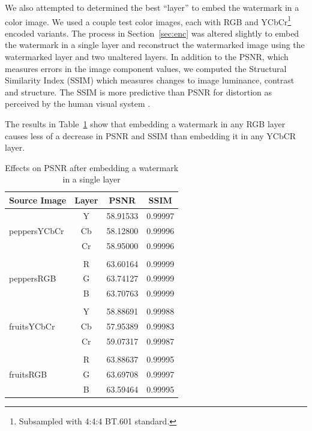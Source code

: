 We also attempted to determined the best ``layer'' to embed the watermark in a color image.
We used a couple test color images, each with RGB and YCbCr\footnote{Subsampled with 4:4:4 BT.601 standard.} encoded variants.
The process in Section~\ref{sec:enc} was altered slightly to embed the watermark in a single layer and reconstruct the watermarked image using the watermarked layer and two unaltered layers.
In addition to the PSNR, which measures errors in the image component values, we computed the Structural Similarity Index (SSIM) which measures changes to image luminance, contrast and structure.
The SSIM is more predictive than PSNR for distortion as perceived by the human visual system \cite{Wang2004}.

The results in Table~\ref{tbl:color-psnr} show that embedding a watermark in any RGB layer causes less of a decrease in PSNR and SSIM than embedding it in any YCbCR layer.

\begin{table}[htpb]
  \centering
  \caption{Effects on PSNR after embedding a watermark in a single layer}
  \label{tbl:color-psnr}
  \begin{tabular}{@{}lcll@{}}
    \toprule
    \multicolumn{1}{c}{Source Image} & Layer & \multicolumn{1}{c}{PSNR}  & \multicolumn{1}{c}{SSIM}   \\
    \midrule
    \multirow{3}{*}{peppersYCbCr}
       & Y   & 58.91533 & 0.99997 \\
       & Cb  & 58.12800 & 0.99996 \\
       & Cr  & 58.95000 & 0.99996 \\
    &  &  \\
    \multirow{3}{*}{peppersRGB}
       & R   & 63.60164 & 0.99999 \\
       & G   & 63.74127 & 0.99999 \\
       & B   & 63.70763 & 0.99999 \\
    &  &  \\
    \multirow{3}{*}{fruitsYCbCr}
      & Y   & 58.88691 & 0.99988 \\
      & Cb  & 57.95389 & 0.99983 \\
      & Cr  & 59.07317 & 0.99987 \\
    &  &  \\
    \multirow{3}{*}{fruitsRGB}
      & R   & 63.88637 & 0.99995 \\
      & G   & 63.69708 & 0.99997 \\
      & B   & 63.59464 & 0.99995 \\
    \bottomrule
  \end{tabular}
\end{table}

